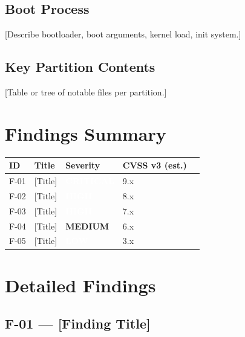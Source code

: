 \documentclass[12pt,a4paper]{article}
\newcommand{\critical}[1]{\textcolor{white}{\colorbox{critical}{\textbf{#1}}}}
\newcommand{\high}[1]{\textcolor{white}{\colorbox{high}{\textbf{#1}}}}
\newcommand{\medium}[1]{\colorbox{medium}{\textbf{#1}}}
\newcommand{\low}[1]{\textcolor{white}{\colorbox{low}{\textbf{#1}}}}
\begin{document}
\subsection{Boot Process}

[Describe bootloader, boot arguments, kernel load, init system.]

\subsection{Key Partition Contents}

[Table or tree of notable files per partition.]

\section{Findings Summary}\label{sec:findings-summary}

\begin{tabularx}{\linewidth}{llXll}
  \toprule
  \rowcolor{tabhead}
  \textcolor{tabheadtext}{\textbf{ID}} &
  \textcolor{tabheadtext}{\textbf{Title}} &
  \textcolor{tabheadtext}{\textbf{Severity}} &
  \textcolor{tabheadtext}{\textbf{CVSS v3 (est.)}} \\
  \midrule
  F-01 & [Title] & \critical{CRITICAL} & 9.x \\
  \rowcolor{rowalt}
  F-02 & [Title] & \high{HIGH}         & 8.x \\
  F-03 & [Title] & \high{HIGH}         & 7.x \\
  \rowcolor{rowalt}
  F-04 & [Title] & \medium{MEDIUM}     & 6.x \\
  F-05 & [Title] & \low{LOW}           & 3.x \\
  \bottomrule
\end{tabularx}

\section{Detailed Findings}\label{sec:detailed-findings}

\subsection*{F-01 — [Finding Title]}
\end{document}
